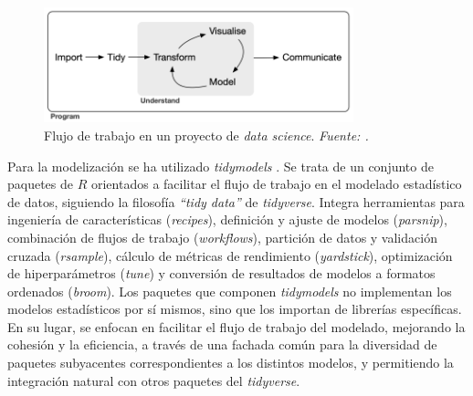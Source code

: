 \documentclass[12pt,a4paper,]{book}
\numberwithin{dummy}{section}
\theoremstyle{ocrenumbox}
\theoremstyle{blacknumex}
\theoremstyle{blacknumbox}
\theoremstyle{ocrenum}
\theoremstyle{ocrenum}
\begin{document}
\begin{figure}[H]
\centering
\includegraphics[width = 0.8\textwidth]{graficos/tidyverse_workflow.png}
\caption[Flujo de trabajo en un proyecto de \textit{data science}]{Flujo de trabajo en un proyecto de \textit{data science}. \it Fuente: \citet{tidyversepackage}.}
\label{fig:tidiverse_workflow}
\end{figure}

Para la modelización se ha utilizado \emph{tidymodels}
\citep{tidymodelspackage}. Se trata de un conjunto de paquetes de \(R\)
orientados a facilitar el flujo de trabajo en el modelado estadístico de
datos, siguiendo la filosofía \emph{``tidy data''} de \emph{tidyverse}.
Integra herramientas para ingeniería de características
(\emph{recipes}), definición y ajuste de modelos (\emph{parsnip}),
combinación de flujos de trabajo (\emph{workflows}), partición de datos
y validación cruzada (\emph{rsample}), cálculo de métricas de
rendimiento (\emph{yardstick}), optimización de hiperparámetros
(\emph{tune}) y conversión de resultados de modelos a formatos ordenados
(\emph{broom}). Los paquetes que componen \emph{tidymodels} no
implementan los modelos estadísticos por sí mismos, sino que los
importan de librerías específicas. En su lugar, se enfocan en facilitar
el flujo de trabajo del modelado, mejorando la cohesión y la eficiencia,
a través de una fachada común para la diversidad de paquetes subyacentes
correspondientes a los distintos modelos, y permitiendo la integración
natural con otros paquetes del \emph{tidyverse}.
\end{document}
